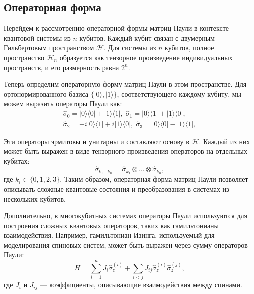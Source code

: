 \documentclass[a4paper]{report}
\begin{document}

\subsection{Операторная форма}

Перейдем к рассмотрению операторной формы матриц Паули в контексте квантовой системы из $n$ кубитов. Каждый кубит связан с двумерным Гильбертовым пространством $\mathcal{H}$. Для системы из $n$ кубитов, полное пространство $\mathcal{H}_n$ образуется как тензорное произведение индивидуальных пространств, и его размерность равна $2^n$.

Теперь определим операторную форму матриц Паули в этом пространстве. Для ортонормированного базиса $\{|0\rangle, |1\rangle\}$, соответствующего каждому кубиту, мы можем выразить операторы Паули как:
\begin{align*}
    \hat{\sigma}_0 = |0\rangle\langle0| + |1\rangle\langle1|,\; \hat{\sigma}_1 = |0\rangle\langle1| + |1\rangle\langle0|,     \\
    \hat{\sigma}_2 = -i|0\rangle\langle1| + i|1\rangle\langle0|,\;  \hat{\sigma}_3 = |0\rangle\langle0| - |1\rangle\langle1|,
\end{align*}

Эти операторы эрмитовы и унитарны и составляют основу в $\mathcal{H}$. Каждый из них может быть выражен в виде тензорного произведения операторов на отдельных кубитах:
$$
\hat{\sigma}_{k_1\ldots k_n} = \hat{\sigma}_{k_1} \otimes \ldots \otimes \hat{\sigma}_{k_n},
$$
где $k_i \in \{0, 1, 2, 3\}$. Таким образом, операторная форма матриц Паули позволяет описывать сложные квантовые состояния и преобразования в системах из нескольких кубитов.

Дополнительно, в многокубитных системах операторы Паули используются для построения сложных квантовых операторов, таких как гамильтонианы взаимодействия. Например, гамильтониан Изинга, используемый для моделирования спиновых систем, может быть выражен через сумму операторов Паули:
$$
H = \sum_{i=1}^{n} J_i \hat{\sigma}_z^{(i)} + \sum_{i<j} J_{ij} \hat{\sigma}_z^{(i)} \hat{\sigma}_z^{(j)},
$$
где $J_i$ и $J_{ij}$ — коэффициенты, описывающие взаимодействия между спинами.
\end{document}
